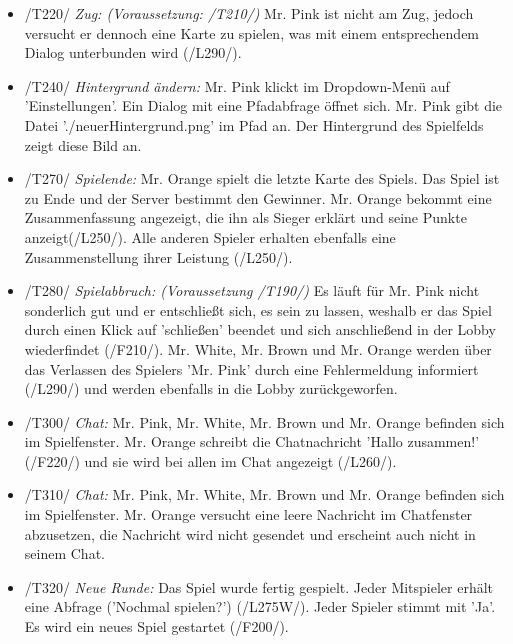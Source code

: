 \documentclass{article}
\begin{document}
\begin{itemize}
\begin{itemize}
		\item /T220/ \textit{Zug: (Voraussetzung: /T210/)} Mr. Pink ist nicht am Zug, jedoch versucht er dennoch eine Karte zu spielen, was mit einem entsprechendem Dialog  unterbunden wird (/L290/).
		
		\item /T240/ \textit{Hintergrund ändern:} Mr. Pink klickt im Dropdown-Menü auf 'Einstellungen'. Ein Dialog mit eine Pfadabfrage öffnet sich. Mr. Pink gibt die Datei './neuerHintergrund.png' im Pfad an. Der Hintergrund des Spielfelds zeigt diese Bild an.
		
		\item /T270/ \textit{Spielende:} Mr. Orange spielt die letzte Karte des Spiels. Das Spiel ist zu Ende und der Server bestimmt den Gewinner. Mr. Orange bekommt eine Zusammenfassung angezeigt, die ihn als Sieger erklärt und seine Punkte anzeigt(/L250/). Alle anderen Spieler erhalten ebenfalls eine Zusammenstellung ihrer Leistung (/L250/).
		
		\item /T280/ \textit{Spielabbruch: (Voraussetzung /T190/)} Es läuft für Mr. Pink nicht sonderlich gut und er entschließt sich, es sein zu lassen, weshalb er das Spiel durch einen Klick auf 'schließen' beendet und sich anschließend in der Lobby wiederfindet (/F210/). Mr. White, Mr. Brown und Mr. Orange werden über das Verlassen des Spielers 'Mr. Pink' durch eine Fehlermeldung informiert (/L290/) und werden ebenfalls in die Lobby zurückgeworfen.
	
		\item /T300/ \textit{Chat:} Mr. Pink, Mr. White, Mr. Brown und Mr. Orange befinden sich im Spielfenster. Mr. Orange schreibt die Chatnachricht 'Hallo zusammen!' (/F220/) und sie wird bei allen im Chat angezeigt (/L260/).
	
		\item /T310/ \textit{Chat:} Mr. Pink, Mr. White, Mr. Brown und Mr. Orange befinden sich im Spielfenster. Mr. Orange versucht eine leere Nachricht im Chatfenster abzusetzen, die Nachricht wird nicht gesendet und erscheint auch nicht in seinem Chat.
		
		\item /T320/ \textit{Neue Runde:} Das Spiel wurde fertig gespielt. Jeder Mitspieler erhält eine Abfrage ('Nochmal spielen?') (/L275W/). Jeder Spieler stimmt mit 'Ja'. Es wird ein neues Spiel gestartet (/F200/).
			
	\end{itemize}
	

\end{itemize}
\end{document}
